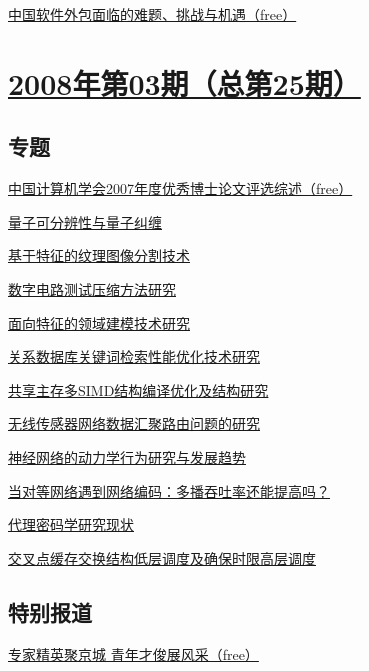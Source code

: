 \documentclass[a4paper]{article}
\begin{document}
\href{http://history.ccf.org.cn/resources/1190201776262/2010/04/15/026086.pdf}{中国软件外包面临的难题、挑战与机遇（free）}


\section{\href{http://history.ccf.org.cn/sites/ccf/jsjtbbd.jsp?contentId=2542567628992}{\textbf{2008年第03期（总第25期）}}}

\subsection{专题}
\href{http://history.ccf.org.cn/resources/1190201776262/2010/04/15/025016.pdf}{中国计算机学会2007年度优秀博士论文评选综述（free）}

\href{http://history.ccf.org.cn/resources/1190201776262/2010/04/15/025018.pdf}{量子可分辨性与量子纠缠}

\href{http://history.ccf.org.cn/resources/1190201776262/2010/04/15/025023.pdf}{基于特征的纹理图像分割技术}

\href{http://history.ccf.org.cn/resources/1190201776262/2010/04/15/025030.pdf}{数字电路测试压缩方法研究}

\href{http://history.ccf.org.cn/resources/1190201776262/2010/04/15/025036.pdf}{面向特征的领域建模技术研究}

\href{http://history.ccf.org.cn/resources/1190201776262/2010/04/15/025046.pdf}{关系数据库关键词检索性能优化技术研究}

\href{http://history.ccf.org.cn/resources/1190201776262/2010/04/15/025054.pdf}{共享主存多SIMD结构编译优化及结构研究}

\href{http://history.ccf.org.cn/resources/1190201776262/2010/04/15/025062.pdf}{无线传感器网络数据汇聚路由问题的研究}

\href{http://history.ccf.org.cn/resources/1190201776262/2010/04/15/025070.pdf}{神经网络的动力学行为研究与发展趋势}

\href{http://history.ccf.org.cn/resources/1190201776262/2010/04/15/025074.pdf}{当对等网络遇到网络编码：多播吞吐率还能提高吗？}

\href{http://history.ccf.org.cn/resources/1190201776262/2010/04/15/025079.pdf}{代理密码学研究现状}

\href{http://history.ccf.org.cn/resources/1190201776262/2010/04/15/025084.pdf}{交叉点缓存交换结构低层调度及确保时限高层调度}

\subsection{特别报道}
\href{http://history.ccf.org.cn/resources/1190201776262/2010/04/15/025008.pdf}{专家精英聚京城  青年才俊展风采（free）}
\end{document}
